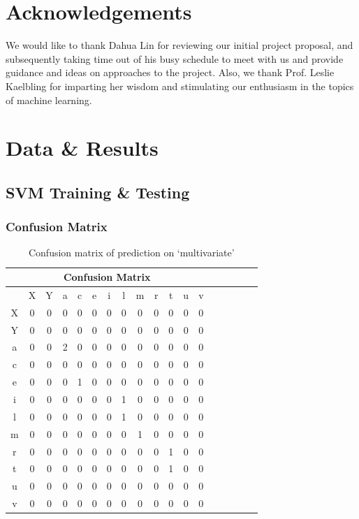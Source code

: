 \documentclass[12pt]{article}
\begin{document}
\section{Acknowledgements}
	We would like to thank Dahua Lin for reviewing our initial project proposal, and subsequently taking time out of his busy schedule to meet with us and provide guidance and ideas on approaches to the project. Also, we thank Prof. Leslie Kaelbling for imparting her wisdom and stimulating our enthusiasm in the topics of machine learning.
	
\newpage

\appendix
	\section{Data \& Results}
		\subsection{SVM Training \& Testing}
		
		\subsubsection{Confusion Matrix}
		\label{appendix:confusion}
			\begin{table}[h!]
\begin{center}	
\begin{tabular}[c]{|c|c|c|c|c|c|c|c|c|c|c|c|c|c|c|c|c|c|}
  \hline
  \multicolumn{13}{|c|}{Confusion Matrix}  \\
  \hline
    & X & Y & a & c & e & i & l & m & r & t & u & v \\ \hline
  X & 0 & 0 & 0 & 0 & 0 & 0 & 0 & 0 & 0 & 0 & 0 & 0 \\ \hline
  Y & 0 & 0 & 0 & 0 & 0 & 0 & 0 & 0 & 0 & 0 & 0 & 0 \\ \hline
  a & 0 & 0 & 2 & 0 & 0 & 0 & 0 & 0 & 0 & 0 & 0 & 0 \\ \hline
  c & 0 & 0 & 0 & 0 & 0 & 0 & 0 & 0 & 0 & 0 & 0 & 0 \\ \hline
  e & 0 & 0 & 0 & 1 & 0 & 0 & 0 & 0 & 0 & 0 & 0 & 0 \\ \hline
  i & 0 & 0 & 0 & 0 & 0 & 0 & 1 & 0 & 0 & 0 & 0 & 0 \\ \hline
  l & 0 & 0 & 0 & 0 & 0 & 0 & 1 & 0 & 0 & 0 & 0 & 0 \\ \hline
  m & 0 & 0 & 0 & 0 & 0 & 0 & 0 & 1 & 0 & 0 & 0 & 0 \\ \hline
  r & 0 & 0 & 0 & 0 & 0 & 0 & 0 & 0 & 0 & 1 & 0 & 0 \\ \hline
  t & 0 & 0 & 0 & 0 & 0 & 0 & 0 & 0 & 0 & 1 & 0 & 0 \\ \hline
  u & 0 & 0 & 0 & 0 & 0 & 0 & 0 & 0 & 0 & 0 & 0 & 0 \\ \hline
  v & 0 & 0 & 0 & 0 & 0 & 0 & 0 & 0 & 0 & 0 & 0 & 0 \\ \hline
\end{tabular}
\caption{Confusion matrix of prediction on `multivariate'}
 \label{table:svm_confusion}
\end{center}
\end{table}
\end{document}
